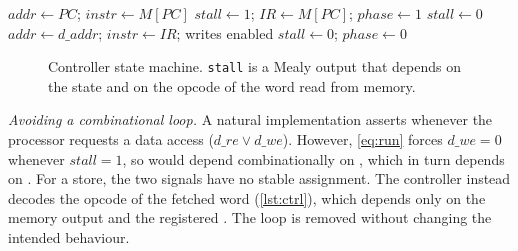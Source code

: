 \documentclass[conference]{IEEEtran}
\newcommand{\sig}[1]{\texttt{\detokenize{#1}}}
\begin{document}
\begin{algorithm}[t]
\caption{Port controller, one clock cycle}
\label{alg:ctrl}
\footnotesize
\begin{algorithmic}[1]
 
  \State $\mathit{addr} \gets \mathit{PC}$;\; $\mathit{instr} \gets M[\mathit{PC}]$
    \State $\mathit{stall}\gets1$;\; $\mathit{IR}\gets M[\mathit{PC}]$;\; $\mathit{phase}\gets1$
  \Else
    \State $\mathit{stall}\gets0$ 
  \EndIf
\Else {}
  \State $\mathit{addr}\gets\mathit{d\_addr}$;\; $\mathit{instr}\gets\mathit{IR}$; writes enabled
  \State $\mathit{stall}\gets0$;\; $\mathit{phase}\gets0$ 
\EndIf
\end{algorithmic}
\end{algorithm}

\begin{figure}[t]
\centering
{}
\caption{Controller state machine. \texttt{stall} is a Mealy output that depends on the state and on
the opcode of the word read from memory.}
\label{fig:fsm}
\end{figure}

\textit{Avoiding a combinational loop.} A natural implementation asserts \sig{stall} whenever the
processor requests a data access ($\mathit{d\_re} \vee \mathit{d\_we}$). However, \eqref{eq:run}
forces $\mathit{d\_we}=0$ whenever $\mathit{stall}=1$, so \sig{stall} would depend combinationally
on \sig{d_we}, which in turn depends on \sig{stall}. For a store, the two signals have no stable
assignment. The controller instead decodes the opcode of the fetched word (\cref{lst:ctrl}), which
depends only on the memory output and the registered \sig{phase}. The loop is removed without
changing the intended behaviour.
\end{document}
